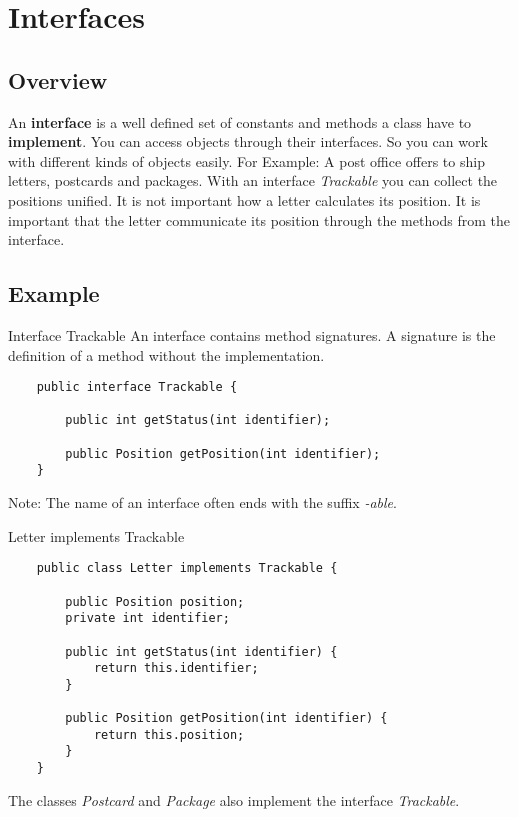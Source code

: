 
\section{Interfaces}
\subsection{Overview}
\begin{frame}{}
    An \textbf{interface} is a well defined set of constants and methods a class have to \textbf{implement}.
    \vfill
    You can access objects through their interfaces. So you can work with different kinds of objects easily.
    \vfill
    For Example: A post office offers to ship letters, postcards and packages. With an interface
    \emph{Trackable} you can collect the positions unified. 
    It is not important how a letter calculates its position.
    It is important that the letter communicate its position through the methods from the interface.
\end{frame}
\subsection{Example}
\begin{frame}[fragile]{Interface Trackable}
    An interface contains method signatures. A signature is the definition of a method without the implementation.
    \begin{lstlisting}
    public interface Trackable {
    
        public int getStatus(int identifier);
        
        public Position getPosition(int identifier);
    }
    \end{lstlisting}
    Note: The name of an interface often ends with the suffix \emph{-able}.
\end{frame}
\begin{frame}[fragile]{Letter implements Trackable}
    \begin{lstlisting}
    public class Letter implements Trackable {
    
        public Position position;
        private int identifier;
    
        public int getStatus(int identifier) {
            return this.identifier;
        }
        
        public Position getPosition(int identifier) {
            return this.position;
        }
    }
    \end{lstlisting}
    The classes \emph{Postcard} and \emph{Package} also implement the interface \emph{Trackable}.
\end{frame}

